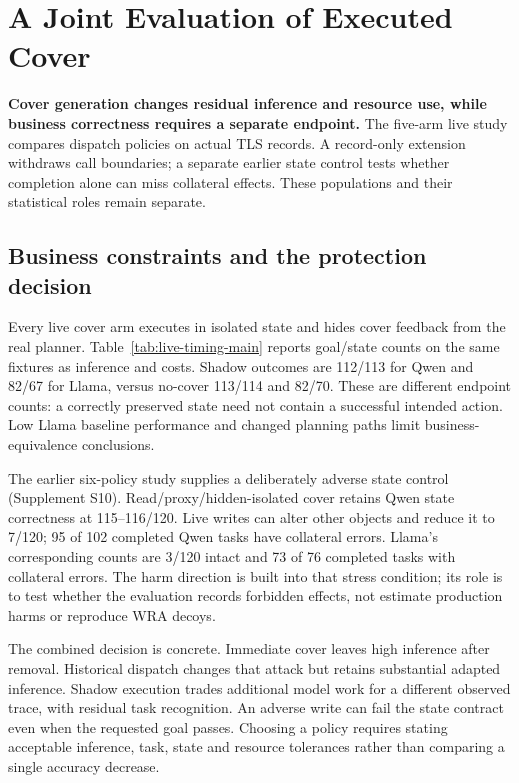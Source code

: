 \section{A Joint Evaluation of Executed Cover}\label{sec:experiment}
\textbf{Cover generation changes residual inference and resource use, while business correctness requires a separate endpoint.}
The five-arm live study compares dispatch policies on actual TLS records. A record-only extension withdraws call boundaries; a separate earlier state control tests whether completion alone can miss collateral effects. These populations and their statistical roles remain separate.


\subsection{Business constraints and the protection decision}
Every live cover arm executes in isolated state and hides cover feedback from the real planner. Table~\ref{tab:live-timing-main} reports goal/state counts on the same fixtures as inference and costs. Shadow outcomes are 112/113 for Qwen and 82/67 for Llama, versus no-cover 113/114 and 82/70. These are different endpoint counts: a correctly preserved state need not contain a successful intended action. Low Llama baseline performance and changed planning paths limit business-equivalence conclusions.

The earlier six-policy study supplies a deliberately adverse state control (Supplement S10). Read/proxy/hidden-isolated cover retains Qwen state correctness at 115--116/120. Live writes can alter other objects and reduce it to 7/120; 95 of 102 completed Qwen tasks have collateral errors. Llama's corresponding counts are 3/120 intact and 73 of 76 completed tasks with collateral errors. The harm direction is built into that stress condition; its role is to test whether the evaluation records forbidden effects, not estimate production harms or reproduce WRA decoys.

The combined decision is concrete. Immediate cover leaves high inference after removal. Historical dispatch changes that attack but retains substantial adapted inference. Shadow execution trades additional model work for a different observed trace, with residual task recognition. An adverse write can fail the state contract even when the requested goal passes. Choosing a policy requires stating acceptable inference, task, state and resource tolerances rather than comparing a single accuracy decrease.
